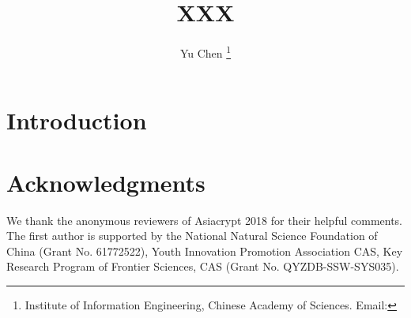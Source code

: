 \documentclass[a4paper,10pt]{article}
\begin{document}
\title{XXX}

\author{
  Yu Chen
  \thanks{Institute of Information Engineering, Chinese Academy of Sciences. Email: }
}

\date{}

\maketitle

\begin{abstract}



\end{abstract}

\thispagestyle{empty}

\newpage
\setcounter{tocdepth}{2}
\tableofcontents
\newpage

\pagestyle{plain}
\setcounter{page}{1}

\section{Introduction}

\section*{Acknowledgments}
We thank the anonymous reviewers of Asiacrypt 2018 for their helpful comments. 
The first author is supported by the National Natural Science Foundation of China (Grant No. 61772522), 
Youth Innovation Promotion Association CAS, Key Research Program of Frontier Sciences, CAS (Grant No. QYZDB-SSW-SYS035). 





\newpage

\appendix
\end{document}
